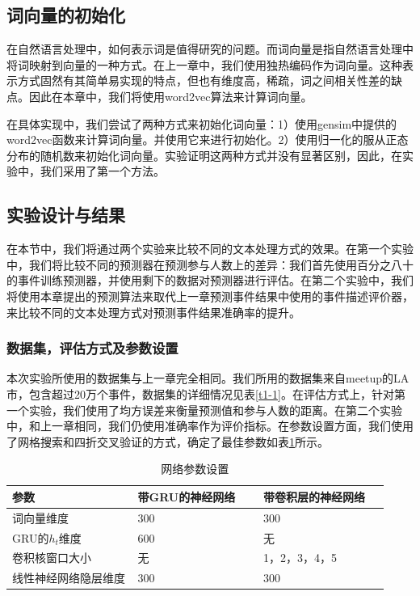 \subsection{词向量的初始化}
在自然语言处理中，如何表示词是值得研究的问题。而词向量是指自然语言处理中将词映射到向量的一种方式。在上一章中，我们使用独热编码作为词向量。这种表示方式固然有其简单易实现的特点，但也有维度高，稀疏，词之间相关性差的缺点。因此在本章中，我们将使用word2vec算法来计算词向量。

在具体实现中，我们尝试了两种方式来初始化词向量：1）使用gensim中提供的word2vec函数来计算词向量。并使用它来进行初始化。2）使用归一化的服从正态分布的随机数来初始化词向量。实验证明这两种方式并没有显著区别，因此，在实验中，我们采用了第一个方法。
\subsection{实验设计与结果}
在本节中，我们将通过两个实验来比较不同的文本处理方式的效果。在第一个实验中，我们将比较不同的预测器在预测参与人数上的差异：我们首先使用百分之八十的事件训练预测器，并使用剩下的数据对预测器进行评估。在第二个实验中，我们将使用本章提出的预测算法来取代上一章预测事件结果中使用的事件描述评价器，来比较不同的文本处理方式对预测事件结果准确率的提升。
\subsubsection{数据集，评估方式及参数设置}
本次实验所使用的数据集与上一章完全相同。我们所用的数据集来自meetup的LA市，包含超过20万个事件，数据集的详细情况见表\ref{t1-1}。在评估方式上，针对第一个实验，我们使用了均方误差来衡量预测值和参与人数的距离。在第二个实验中，和上一章相同，我们仍使用准确率作为评价指标。在参数设置方面，我们使用了网格搜索和四折交叉验证的方式，确定了最佳参数如表\ref{t2-1}所示。

\begin{table}[htb]
\caption{\label{t2-1}网络参数设置}
\centering
\begin{tabular*}{\linewidth}{p{0.333\linewidth}p{0.333\linewidth}p{0.333\linewidth}}
\toprule
    参数         & 带GRU的神经网络 & 带卷积层的神经网络 \\
\midrule
    词向量维度      & 300       & 300       \\
    GRU的\(h_t\)维度   & 600       & 无         \\
    卷积核窗口大小    & 无         & 1，2，3，4，5 \\
    线性神经网络隐层维度 & 300       & 300      \\ 
\bottomrule
\end{tabular*}
\end{table}

